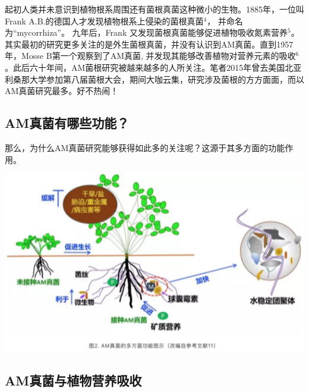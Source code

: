 \documentclass[]{book}
\begin{document}
起初人类并未意识到植物根系周围还有菌根真菌这种微小的生物。1885年，一位叫Frank A.B.的德国人才发现植物根系上侵染的菌根真菌\(^4\)， 并命名为``mycorrhiza''。 九年后，Frank 又发现菌根真菌能够促进植物吸收氮素营养\(^5\)。其实最初的研究更多关注的是外生菌根真菌，并没有认识到AM真菌。直到1957年，Mosse B第一个观察到了AM真菌, 并发现其能够改善植物对营养元素的吸收\(^6\)。此后六十年间，AM菌根研究被越来越多的人所关注。笔者2015年曾去美国北亚利桑那大学参加第八届菌根大会，期间大咖云集，研究涉及菌根的方方面面，而以AM真菌研究最多。好不热闹！

\hypertarget{amux771fux83ccux6709ux54eaux4e9bux529fux80fd}{%
\subsection{AM真菌有哪些功能？}\label{amux771fux83ccux6709ux54eaux4e9bux529fux80fd}}

那么，为什么AM真菌研究能够获得如此多的关注呢？这源于其多方面的功能作用。

\includegraphics[width=6.67in]{images/am2}

\hypertarget{amux771fux83ccux4e0eux690dux7269ux8425ux517bux5438ux6536}{%
\subsection{AM真菌与植物营养吸收}\label{amux771fux83ccux4e0eux690dux7269ux8425ux517bux5438ux6536}}
\end{document}
